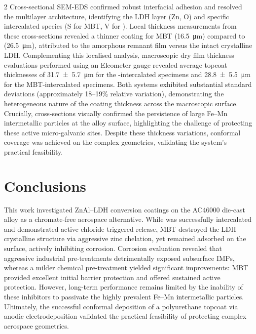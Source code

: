 \documentclass[a4paper,10pt]{article}
\begin{document}
\begin{multicols}{2}
Cross-sectional SEM-EDS confirmed robust interfacial adhesion and resolved the multilayer architecture, identifying the LDH layer (Zn, O) and specific intercalated species (S for MBT, V for ). Local thickness measurements from these cross-sections revealed a thinner coating for MBT (\qty{16.5}{\micro\meter}) compared to  (\qty{26.5}{\micro\meter}), attributed to the amorphous remnant film versus the intact crystalline LDH. Complementing this localised analysis, macroscopic dry film thickness evaluations performed using an Elcometer gauge revealed average topcoat thicknesses of \qty{31.7 \pm 5.7}{\micro\meter} for the -intercalated specimens and \qty{28.8 \pm 5.5}{\micro\meter} for the MBT-intercalated specimens. Both systems exhibited substantial standard deviations (approximately 18--19\% relative variation), demonstrating the heterogeneous nature of the coating thickness across the macroscopic surface. Crucially, cross-sections visually confirmed the persistence of large Fe--Mn intermetallic particles at the alloy surface, highlighting the challenge of protecting these active micro-galvanic sites. Despite these thickness variations, conformal coverage was achieved on the complex geometries, validating the system's practical feasibility.

\section{Conclusions}
This work investigated ZnAl--LDH conversion coatings on the AC46000 die-cast alloy as a chromate-free aerospace alternative. While  was successfully intercalated and demonstrated active chloride-triggered release, MBT destroyed the LDH crystalline structure via aggressive zinc chelation, yet remained adsorbed on the surface, actively inhibiting corrosion. Corrosion evaluation revealed that aggressive industrial pre-treatments detrimentally exposed subsurface IMPs, whereas a milder chemical pre-treatment yielded significant improvements: MBT provided excellent initial barrier protection and  offered sustained active protection. However, long-term performance remains limited by the inability of these inhibitors to passivate the highly prevalent Fe--Mn intermetallic particles. Ultimately, the successful conformal deposition of a polyurethane topcoat via anodic electrodeposition validated the practical feasibility of protecting complex aerospace geometries.


{\scriptsize


}

\end{multicols}
\end{document}
